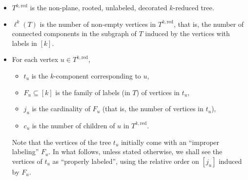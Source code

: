 \documentclass{article}
\theoremstyle{remark}
\newcommand{\red}{\mathrm{red}}
\begin{document}
\begin{itemize}
    \item $T^{k,\red}$ is the non-plane, rooted, unlabeled, decorated $k$-reduced tree.
    \item $\ell^{k}{\left( T \right)}$ is the number of non-empty vertices in $T^{k,\red}$, that is, the number of connected components in the subgraph of $T$ induced by the vertices with labels in $[k]$.
    \item For each vertex $u \in T^{k,\red}$,
    \begin{itemize}
        \item  $t_u$ is the $k$-component corresponding to $u$,
        \item $F_u \subseteq [k]$ is the family of labels (in $T$) of vertices in $t_u$,
        \item $j_u$ is the cardinality of $F_u$ (that is, the number of vertices in $t_u$),
        \item $c_u$ is the number of children of $u$ in $T^{k,\red}$.
    \end{itemize} 
    Note that the vertices of the tree $t_u$ initially come with an \enquote{improper labeling} $F_u$.
    In what follows, unless stated otherwise, we shall see the vertices of $t_u$ as \enquote{properly labeled}, using the relative order on $[j_u]$ induced by $F_u$.
    

\end{itemize}
\end{document}

